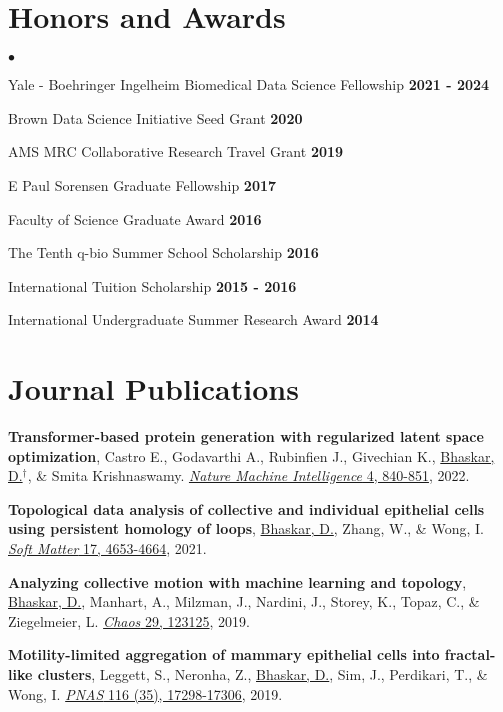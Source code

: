 \documentclass[margin,line]{res}
\newenvironment{list2}{
  \begin{list}{$\bullet$}{
      \setlength{\itemsep}{0in}
      \setlength{\parsep}{0in} \setlength{\parskip}{0in}
      \setlength{\topsep}{0in} \setlength{\partopsep}{0in}
      \setlength{\leftmargin}{0.2in}}}{\end{list}}
\begin{document}
\begin{resume}
\vspace*{.12cm}

\section{\sc Honors and Awards}
\begin{list2}
\setlength\itemsep{0.25em}
\item Yale - Boehringer Ingelheim Biomedical Data Science Fellowship \hfill {\bf 2021 - 2024}
\item Brown Data Science Initiative Seed Grant \hfill {\bf 2020}
\item AMS MRC Collaborative Research Travel Grant \hfill {\bf 2019}
\item E Paul Sorensen Graduate Fellowship \hfill {\bf 2017}
\item Faculty of Science Graduate Award \hfill {\bf 2016}
\item The Tenth q-bio Summer School Scholarship \hfill {\bf 2016}
\item International Tuition Scholarship \hfill {\bf 2015 - 2016}
\item International Undergraduate Summer Research Award \hfill {\bf 2014}
\end{list2}

\section{\sc Journal Publications}
{\renewcommand\leftmargini{0em}
\begin{etaremune}[start=8]
\item{\bf Transformer-based protein generation with regularized latent space optimization}, 
Castro E., Godavarthi A., Rubinfien J., Givechian K., \underline{Bhaskar, D.}$^\dagger$, \& Smita Krishnaswamy.
\href{https://doi.org/10.1039/D1SM00072A}{\textit{Nature Machine Intelligence} 4, 840-851}, 2022.
\vspace*{.1cm}
\item{\bf Topological data analysis of collective and individual epithelial cells using persistent homology of loops}, 
\underline{Bhaskar, D.}, Zhang, W., \& Wong, I. 
\href{https://doi.org/10.1039/D1SM00072A}{\textit{Soft Matter} 17, 4653-4664}, 2021.
\vspace*{.1cm}
\item{\bf Analyzing collective motion with machine learning and topology}, 
\underline{Bhaskar, D.}, Manhart, A., Milzman, J., Nardini, J., Storey, K., Topaz, C., \& Ziegelmeier, L. 
\href{https://aip.scitation.org/doi/10.1063/1.5125493}{\textit{Chaos} 29, 123125}, 2019.
\vspace*{.1cm}
\item{\bf Motility-limited aggregation of mammary epithelial cells into fractal-like clusters}, 
Leggett, S., Neronha, Z., \underline{Bhaskar, D.}, Sim, J., Perdikari, T., \& Wong, I. 
\href{https://www.pnas.org/content/116/35/17298.short}{\textit{PNAS} 116 (35), 17298-17306}, 2019.
\end{etaremune}
} 


\end{resume}
\end{document}
